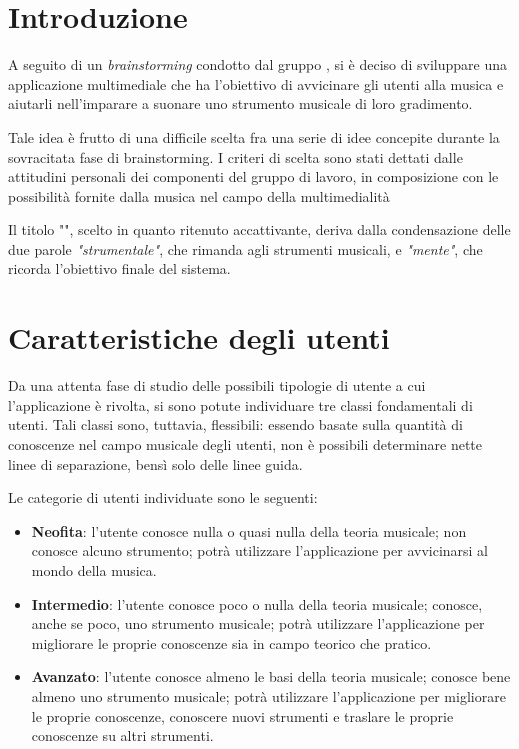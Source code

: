 \section{Introduzione}
A seguito di un \textit{brainstorming} condotto dal gruppo \theteam{}, si è deciso di sviluppare una applicazione multimediale che ha l'obiettivo di avvicinare gli utenti alla musica e aiutarli nell'imparare a suonare uno strumento musicale di loro gradimento.

Tale idea è frutto di una difficile scelta fra una serie di idee concepite durante la sovracitata fase di brainstorming. I criteri di scelta sono stati dettati dalle attitudini personali dei componenti del gruppo di lavoro, in composizione con le possibilità fornite dalla musica nel campo della multimedialità

Il titolo "\ProjectTitle{}", scelto in quanto ritenuto accattivante, deriva dalla condensazione delle due parole \emph{"strumentale"}, che rimanda agli strumenti musicali, e \emph{"mente"}, che ricorda l'obiettivo finale del sistema.

\section{Caratteristiche degli utenti}
Da una attenta fase di studio delle possibili tipologie di utente a cui l'applicazione è rivolta, si sono potute individuare tre classi fondamentali di utenti. Tali classi sono, tuttavia, flessibili: essendo basate sulla quantità di conoscenze nel campo musicale degli utenti, non è possibili determinare nette linee di separazione, bensì solo delle linee guida.

Le categorie di utenti individuate sono le seguenti:
\begin{itemize}
	\item \textbf{Neofita}: l'utente conosce nulla o quasi nulla della teoria musicale; non conosce alcuno strumento; potrà utilizzare l'applicazione per avvicinarsi al mondo della musica.
	\item \textbf{Intermedio}: l'utente conosce poco o nulla della teoria musicale; conosce, anche se poco, uno strumento musicale; potrà utilizzare l'applicazione per migliorare le proprie conoscenze sia in campo teorico che pratico.
	\item \textbf{Avanzato}: l'utente conosce almeno le basi della teoria musicale; conosce bene almeno uno strumento musicale; potrà utilizzare l'applicazione per migliorare le proprie conoscenze, conoscere nuovi strumenti e traslare le proprie conoscenze su altri strumenti.
\end{itemize}

